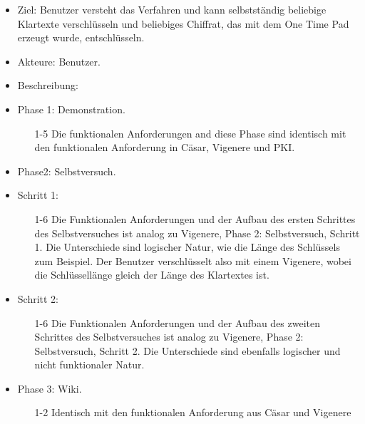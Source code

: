 \documentclass{article}
\begin{document}
\begin{itemize}[label={}]
\item Ziel: Benutzer versteht das Verfahren und kann selbstständig beliebige Klartexte verschlüsseln und beliebiges Chiffrat, das mit dem One Time Pad erzeugt wurde, entschlüsseln.
\item Akteure: Benutzer.
\item Beschreibung:
\item Phase 1: Demonstration.
\begin{enumerate}
 \item[1-5] Die funktionalen Anforderungen and diese Phase sind identisch mit den 
            funktionalen Anforderung in Cäsar, Vigenere und PKI.
\end{enumerate}

\item Phase2: Selbstversuch.
\item Schritt 1:
\begin{enumerate}
\item[1-6] Die Funktionalen Anforderungen und der Aufbau des ersten Schrittes des Selbstversuches ist analog zu Vigenere, Phase 2: Selbstversuch, Schritt 1. 
           Die Unterschiede sind logischer Natur, wie die Länge des Schlüssels zum Beispiel. 
           Der Benutzer verschlüsselt also mit einem Vigenere, wobei die Schlüssellänge gleich der Länge des Klartextes ist.
\end{enumerate}

\item Schritt 2:
\begin{enumerate}
\item[1-6] Die Funktionalen Anforderungen und der Aufbau des zweiten Schrittes des Selbstversuches ist analog zu Vigenere, Phase 2: Selbstversuch, Schritt 2. 
           Die Unterschiede sind ebenfalls logischer und nicht funktionaler Natur.
\end{enumerate}
\item Phase 3: Wiki.
\begin{enumerate}
 \item[1-2] Identisch mit den funktionalen Anforderung aus Cäsar und Vigenere
\end{enumerate}
\end{itemize}
\end{document}
